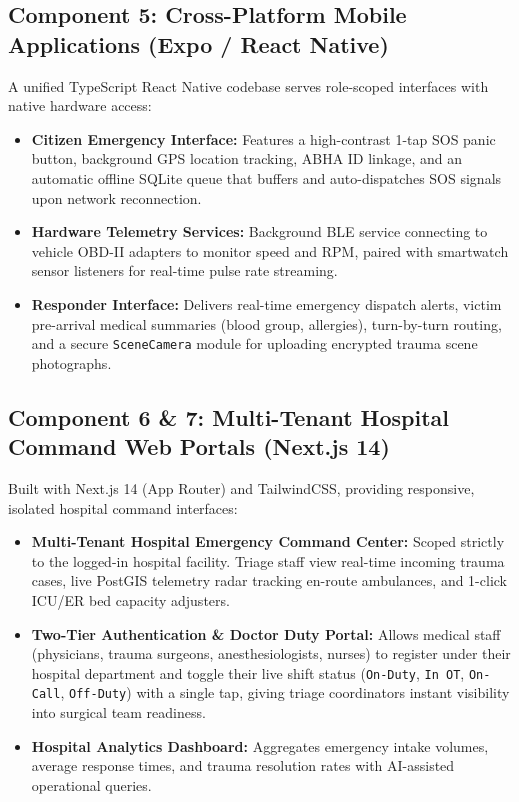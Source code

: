 \documentclass[12pt,a4paper]{article}
\begin{document}
\clearpage
\subsection{Component 5: Cross-Platform Mobile Applications (Expo / React Native)}
A unified TypeScript React Native codebase serves role-scoped interfaces with native hardware access:
\begin{itemize}
    \item \textbf{Citizen Emergency Interface:} Features a high-contrast 1-tap SOS panic button, background GPS location tracking, ABHA ID linkage, and an automatic offline SQLite queue that buffers and auto-dispatches SOS signals upon network reconnection.
    \item \textbf{Hardware Telemetry Services:} Background BLE service connecting to vehicle OBD-II adapters to monitor speed and RPM, paired with smartwatch sensor listeners for real-time pulse rate streaming.
    \item \textbf{Responder Interface:} Delivers real-time emergency dispatch alerts, victim pre-arrival medical summaries (blood group, allergies), turn-by-turn routing, and a secure \texttt{SceneCamera} module for uploading encrypted trauma scene photographs.
\end{itemize}

\subsection{Component 6 \& 7: Multi-Tenant Hospital Command Web Portals (Next.js 14)}
Built with Next.js 14 (App Router) and TailwindCSS, providing responsive, isolated hospital command interfaces:
\begin{itemize}
    \item \textbf{Multi-Tenant Hospital Emergency Command Center:} Scoped strictly to the logged-in hospital facility. Triage staff view real-time incoming trauma cases, live PostGIS telemetry radar tracking en-route ambulances, and 1-click ICU/ER bed capacity adjusters.
    \item \textbf{Two-Tier Authentication \& Doctor Duty Portal:} Allows medical staff (physicians, trauma surgeons, anesthesiologists, nurses) to register under their hospital department and toggle their live shift status (\texttt{On-Duty}, \texttt{In OT}, \texttt{On-Call}, \texttt{Off-Duty}) with a single tap, giving triage coordinators instant visibility into surgical team readiness.
    \item \textbf{Hospital Analytics Dashboard:} Aggregates emergency intake volumes, average response times, and trauma resolution rates with AI-assisted operational queries.
\end{itemize}
\end{document}
